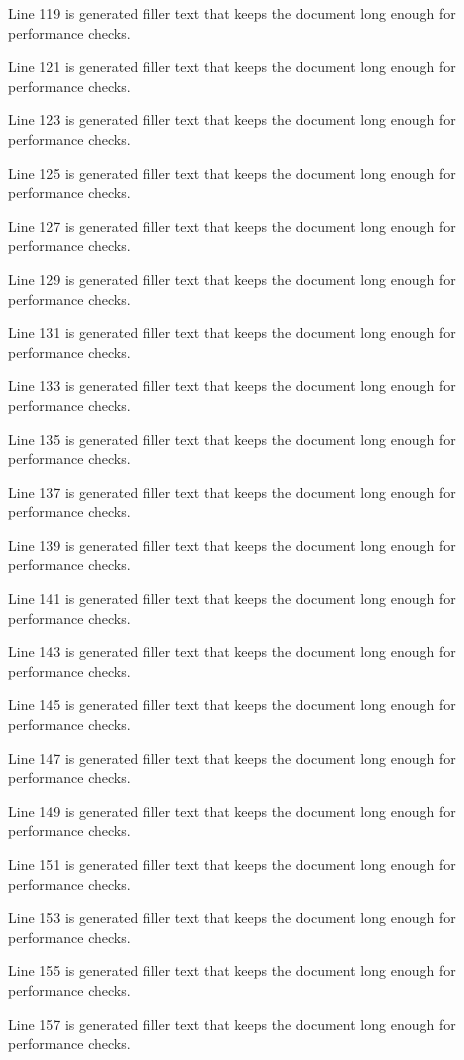 Line 119 is generated filler text that keeps the document long enough for performance checks.

Line 121 is generated filler text that keeps the document long enough for performance checks.

Line 123 is generated filler text that keeps the document long enough for performance checks.

Line 125 is generated filler text that keeps the document long enough for performance checks.

Line 127 is generated filler text that keeps the document long enough for performance checks.

Line 129 is generated filler text that keeps the document long enough for performance checks.

Line 131 is generated filler text that keeps the document long enough for performance checks.

Line 133 is generated filler text that keeps the document long enough for performance checks.

Line 135 is generated filler text that keeps the document long enough for performance checks.

Line 137 is generated filler text that keeps the document long enough for performance checks.

Line 139 is generated filler text that keeps the document long enough for performance checks.

Line 141 is generated filler text that keeps the document long enough for performance checks.

Line 143 is generated filler text that keeps the document long enough for performance checks.

Line 145 is generated filler text that keeps the document long enough for performance checks.

Line 147 is generated filler text that keeps the document long enough for performance checks.

Line 149 is generated filler text that keeps the document long enough for performance checks.

Line 151 is generated filler text that keeps the document long enough for performance checks.

Line 153 is generated filler text that keeps the document long enough for performance checks.

Line 155 is generated filler text that keeps the document long enough for performance checks.

Line 157 is generated filler text that keeps the document long enough for performance checks.

